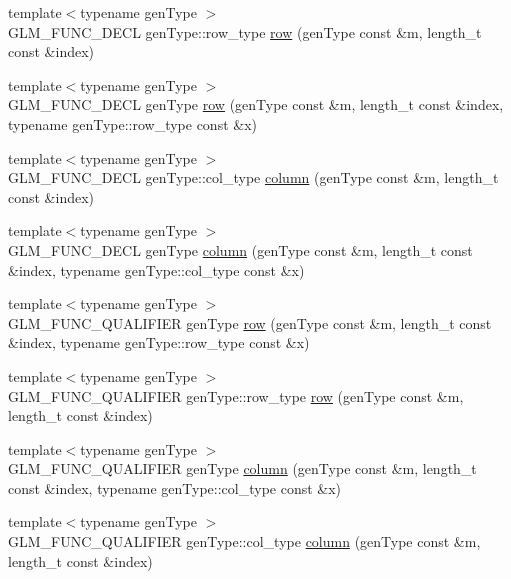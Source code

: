 \begin{DoxyCompactItemize}
\item 
{\footnotesize template$<$typename gen\+Type $>$ }\\G\+L\+M\+\_\+\+F\+U\+N\+C\+\_\+\+D\+E\+CL gen\+Type\+::row\+\_\+type \hyperlink{group__gtc__matrix__access_ga5b874831eef18913dbe30153e52a2476}{row} (gen\+Type const \&m, length\+\_\+t const \&index)
\item 
{\footnotesize template$<$typename gen\+Type $>$ }\\G\+L\+M\+\_\+\+F\+U\+N\+C\+\_\+\+D\+E\+CL gen\+Type \hyperlink{group__gtc__matrix__access_gacb34e8dca9cd0efdd247a65e36ed0a86}{row} (gen\+Type const \&m, length\+\_\+t const \&index, typename gen\+Type\+::row\+\_\+type const \&x)
\item 
{\footnotesize template$<$typename gen\+Type $>$ }\\G\+L\+M\+\_\+\+F\+U\+N\+C\+\_\+\+D\+E\+CL gen\+Type\+::col\+\_\+type \hyperlink{group__gtc__matrix__access_ga5c37fbeb062151f930e8a231c37e6b81}{column} (gen\+Type const \&m, length\+\_\+t const \&index)
\item 
{\footnotesize template$<$typename gen\+Type $>$ }\\G\+L\+M\+\_\+\+F\+U\+N\+C\+\_\+\+D\+E\+CL gen\+Type \hyperlink{group__gtc__matrix__access_gaff0c6f887deb04ce0519084d32aadb85}{column} (gen\+Type const \&m, length\+\_\+t const \&index, typename gen\+Type\+::col\+\_\+type const \&x)
\item 
{\footnotesize template$<$typename gen\+Type $>$ }\\G\+L\+M\+\_\+\+F\+U\+N\+C\+\_\+\+Q\+U\+A\+L\+I\+F\+I\+ER gen\+Type \hyperlink{group__gtc__matrix__access_gacb34e8dca9cd0efdd247a65e36ed0a86}{row} (gen\+Type const \&m, length\+\_\+t const \&index, typename gen\+Type\+::row\+\_\+type const \&x)
\item 
{\footnotesize template$<$typename gen\+Type $>$ }\\G\+L\+M\+\_\+\+F\+U\+N\+C\+\_\+\+Q\+U\+A\+L\+I\+F\+I\+ER gen\+Type\+::row\+\_\+type \hyperlink{group__gtc__matrix__access_ga5b874831eef18913dbe30153e52a2476}{row} (gen\+Type const \&m, length\+\_\+t const \&index)
\item 
{\footnotesize template$<$typename gen\+Type $>$ }\\G\+L\+M\+\_\+\+F\+U\+N\+C\+\_\+\+Q\+U\+A\+L\+I\+F\+I\+ER gen\+Type \hyperlink{group__gtc__matrix__access_gaff0c6f887deb04ce0519084d32aadb85}{column} (gen\+Type const \&m, length\+\_\+t const \&index, typename gen\+Type\+::col\+\_\+type const \&x)
\item 
{\footnotesize template$<$typename gen\+Type $>$ }\\G\+L\+M\+\_\+\+F\+U\+N\+C\+\_\+\+Q\+U\+A\+L\+I\+F\+I\+ER gen\+Type\+::col\+\_\+type \hyperlink{group__gtc__matrix__access_ga5c37fbeb062151f930e8a231c37e6b81}{column} (gen\+Type const \&m, length\+\_\+t const \&index)

\end{DoxyCompactItemize}
